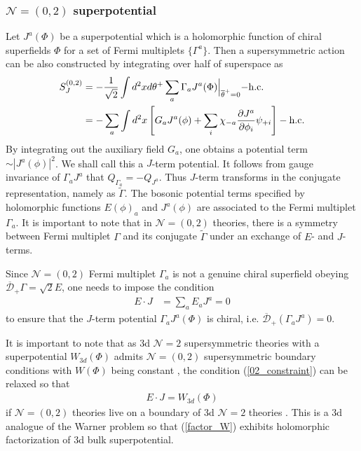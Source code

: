 \documentclass{article}
\numberwithin{equation}{section}
\begin{document}
\subsubsection{$\mathcal{N}=(0,2)$ superpotential}
Let $J^{a}(\Phi)$ be a superpotential which is a holomorphic function of chiral superfields $\Phi$ 
for a set of Fermi multiplets $\{\Gamma^{a}\}$. 
Then a supersymmetric action can be also constructed by integrating over half of superspace as
\begin{align}
\label{02_spot1}
S_{J}^{(0,2)}&=-\frac{1}{\sqrt{2}}\int d^{2}x d\theta^{+} \sum_{a}\Gamma_{a}J^{a}(\Phi)\Bigl|_{\overline{\theta}^{+}=0}-\mathrm{h.c.}\nonumber\\
&=-\sum_{a}\int d^{2}x \left[G_{a}J^{a}(\phi)+\sum_{i}\chi_{-a}\frac{\partial J^{a}}{\partial \phi_{i}}\psi_{+i}\right] - \mathrm{h.c.}
\end{align}
By integrating out the auxiliary field $G_{a}$, one obtains a potential term $\sim |J^{a}(\phi)|^{2}$. 
We shall call this a $J$-term potential. 
It follows from gauge invariance of $\Gamma_{a}J^{a}$ that 
$Q_{\Gamma_{a}}=-Q_{J^{a}}$. 
Thus $J$-term transforms in the conjugate representation, namely as $\widetilde{\Gamma}$. 
The bosonic potential terms specified by holomorphic functions $E(\phi)_{a}$ and $J^{a}(\phi)$ 
are associated to the Fermi multiplet $\Gamma_{a}$. 
It is important to note that in $\mathcal{N}=(0,2)$ theories, there is a symmetry 
between Fermi multiplet $\Gamma$ and its conjugate $\widetilde{\Gamma}$ 
under an exchange of $E$- and $J$-terms. 



Since $\mathcal{N}=(0,2)$ Fermi multiplet $\Gamma_{a}$ is not a genuine chiral superfield 
obeying $\overline{\mathcal{D}}_{+}\Gamma=\sqrt{2}E$, 
one needs to impose the condition 
\begin{align}
\label{02_constraint}
E\cdot J&=\sum_{a}E_{a}J^{a}=0
\end{align}
to ensure that the $J$-term potential $\Gamma_{a}J^{a}(\Phi)$ is chiral, 
i.e. $\overline{\mathcal{D}}_{+}(\Gamma_{a}J^{a})=0$. 


It is important to note that 
as 3d $\mathcal{N}=2$ supersymmetric theories with a superpotential $W_{3d}(\Phi)$ admits 
$\mathcal{N}=(0,2)$ supersymmetric boundary conditions with $W(\Phi)$ being constant \cite{Okazaki:2013kaa}, 
the condition (\ref{02_constraint}) can be relaxed so that 
\begin{align}
\label{factor_W}
E\cdot J=W_{3d}(\Phi)
\end{align}
if $\mathcal{N}=(0,2)$ theories live on a boundary of 3d $\mathcal{N}=2$ theories \cite{Gadde:2013sca, Dimofte:2017tpi}. 
This is a 3d analogue of the Warner problem \cite{Warner:1995ay} so that 
(\ref{factor_W}) exhibits holomorphic factorization of 3d bulk superpotential. 
\end{document}
